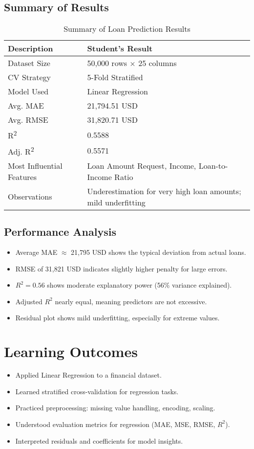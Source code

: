 \documentclass[11pt]{article}
\begin{document}
\subsection*{Summary of Results}
\begin{table}[H]
\centering
\begin{tabular}{|p{8cm}|p{6cm}|}
\hline
\textbf{Description} & \textbf{Student’s Result} \\ \hline
Dataset Size & 50,000 rows × 25 columns \\ \hline
CV Strategy & 5-Fold Stratified \\ \hline
Model Used & Linear Regression \\ \hline
Avg. MAE & 21,794.51 USD \\ \hline
Avg. RMSE & 31,820.71 USD \\ \hline
R\textsuperscript{2} & 0.5588 \\ \hline
Adj. R\textsuperscript{2} & 0.5571 \\ \hline
Most Influential Features & Loan Amount Request, Income, Loan-to-Income Ratio \\ \hline
Observations & Underestimation for very high loan amounts; mild underfitting \\ \hline
\end{tabular}
\caption{Summary of Loan Prediction Results}
\end{table}

\subsection*{Performance Analysis}
\begin{itemize}
    \item Average MAE $\approx$ 21,795 USD shows the typical deviation from actual loans.
    \item RMSE of 31,821 USD indicates slightly higher penalty for large errors.
    \item \(R^2 = 0.56\) shows moderate explanatory power (56\% variance explained).
    \item Adjusted \(R^2\) nearly equal, meaning predictors are not excessive.
    \item Residual plot shows mild underfitting, especially for extreme values.
\end{itemize}

\section*{Learning Outcomes}
\begin{itemize}
    \item Applied Linear Regression to a financial dataset.
    \item Learned stratified cross-validation for regression tasks.
    \item Practiced preprocessing: missing value handling, encoding, scaling.
    \item Understood evaluation metrics for regression (MAE, MSE, RMSE, \(R^2\)).
    \item Interpreted residuals and coefficients for model insights.
\end{itemize}
\end{document}
